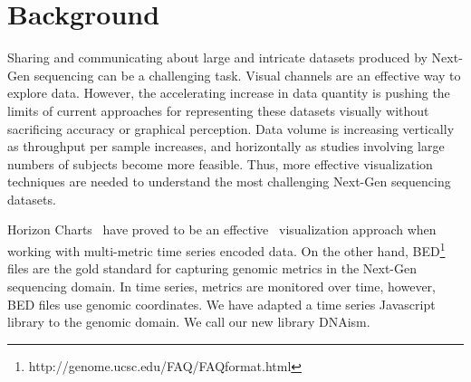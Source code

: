 \documentclass[twocolumn]{bmcart}
\begin{document}


\section*{Background}

Sharing and communicating about large and intricate datasets produced by
Next-Gen sequencing can be a challenging task. Visual channels are an effective
way to explore data. However, the accelerating increase in data quantity is
pushing the limits of current approaches for representing these datasets
visually without sacrificing accuracy or graphical perception.  Data volume is
increasing vertically as throughput per sample increases, and horizontally as
studies involving large numbers of subjects become more feasible.  Thus, more
effective visualization techniques are needed to understand the most
challenging Next-Gen sequencing datasets.

Horizon Charts~\cite{time-in-the-horizon} have proved to be an effective~\cite{2009-horizon}
visualization approach when working with multi-metric time series encoded data.
On the other hand, BED\footnote{http://genome.ucsc.edu/FAQ/FAQformat.html}
files are the gold standard for capturing genomic metrics in the Next-Gen
sequencing domain. In time series, metrics are monitored over time, however,
BED files use genomic coordinates. We have adapted a time series Javascript
library to the genomic domain. We call our new library DNAism.
\end{document}
